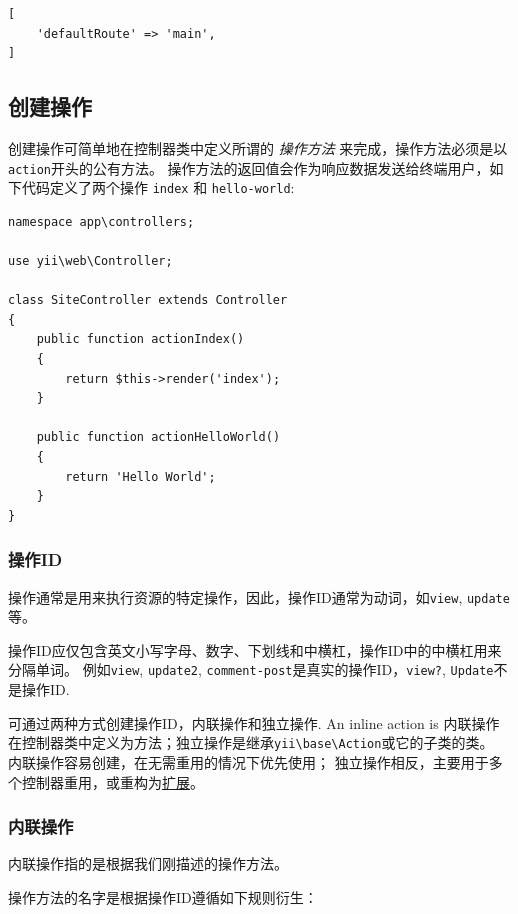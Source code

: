 \lstset{language=php}\begin{lstlisting}
[
    'defaultRoute' => 'main',
]
\end{lstlisting}
\subsection{创建操作 \label{structure-controllers.md::creating-actions}}
创建操作可简单地在控制器类中定义所谓的 \textit{操作方法} 来完成，操作方法必须是以\lstinline|action|开头的公有方法。
操作方法的返回值会作为响应数据发送给终端用户，如下代码定义了两个操作 \lstinline|index| 和 \lstinline|hello-world|:

\lstset{language=php}\begin{lstlisting}
namespace app\controllers;

use yii\web\Controller;

class SiteController extends Controller
{
    public function actionIndex()
    {
        return $this->render('index');
    }

    public function actionHelloWorld()
    {
        return 'Hello World';
    }
}
\end{lstlisting}
\subsubsection{操作ID \label{structure-controllers.md::action-ids}}
操作通常是用来执行资源的特定操作，因此，操作ID通常为动词，如\lstinline|view|, \lstinline|update|等。

操作ID应仅包含英文小写字母、数字、下划线和中横杠，操作ID中的中横杠用来分隔单词。
例如\lstinline|view|, \lstinline|update2|, \lstinline|comment-post|是真实的操作ID，\lstinline|view?|, \lstinline|Update|不是操作ID.

可通过两种方式创建操作ID，内联操作和独立操作. An inline action is
内联操作在控制器类中定义为方法；独立操作是继承\texttt{yii{\allowbreak{}\textbackslash}base{\allowbreak{}\textbackslash}Action}或它的子类的类。
内联操作容易创建，在无需重用的情况下优先使用；
独立操作相反，主要用于多个控制器重用，或重构为\hyperref[structure-extensions.md]{扩展}。

\subsubsection{内联操作 \label{structure-controllers.md::inline-actions}}
内联操作指的是根据我们刚描述的操作方法。

操作方法的名字是根据操作ID遵循如下规则衍生：

